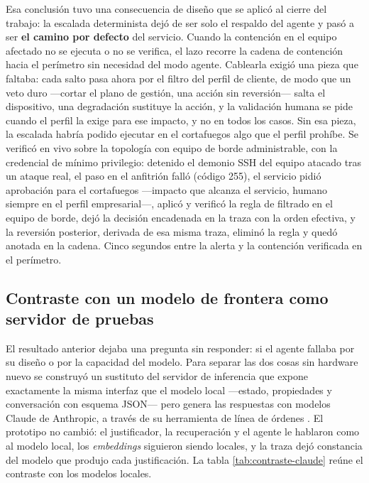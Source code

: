 Esa conclusión tuvo una consecuencia de diseño que se aplicó al cierre del trabajo: la escalada
determinista dejó de ser solo el respaldo del agente y pasó a ser \textbf{el camino por defecto} del
servicio. Cuando la contención en el equipo afectado no se ejecuta o no se verifica, el lazo recorre
la cadena de contención hacia el perímetro sin necesidad del modo agente. Cablearla exigió una
pieza que faltaba: cada salto pasa ahora por el filtro del perfil de cliente, de modo que un veto
duro ---cortar el plano de gestión, una acción sin reversión--- salta el dispositivo, una degradación
sustituye la acción, y la validación humana se pide cuando el perfil la exige para ese impacto, y no
en todos los casos. Sin esa pieza, la escalada habría podido ejecutar en el cortafuegos algo que el
perfil prohíbe. Se verificó en vivo sobre la topología con equipo de borde administrable, con la
credencial de mínimo privilegio: detenido el demonio SSH del equipo atacado tras un ataque real,
el paso en el anfitrión falló (código 255), el servicio pidió aprobación para el cortafuegos
---impacto que alcanza el servicio, humano siempre en el perfil empresarial---, aplicó y verificó
la regla de filtrado en el equipo de borde, dejó la decisión encadenada en la traza con la orden
efectiva, y la reversión posterior, derivada de esa misma traza, eliminó la regla y quedó anotada
en la cadena. Cinco segundos entre la alerta y la contención verificada en el perímetro.

\subsection{Contraste con un modelo de frontera como servidor de pruebas}
\label{sec:contraste-claude}

El resultado anterior dejaba una pregunta sin responder: si el agente fallaba por su diseño o por la
capacidad del modelo. Para separar las dos cosas sin hardware nuevo se construyó un sustituto del
servidor de inferencia que expone exactamente la misma interfaz que el modelo local ---estado,
propiedades y conversación con esquema JSON--- pero genera las respuestas con modelos Claude de
Anthropic, a través de su herramienta de línea de órdenes \cite{claudecode}. El prototipo no cambió:
el justificador, la recuperación y el agente le hablaron como al modelo local, los \emph{embeddings}
siguieron siendo locales, y la traza dejó constancia del modelo que produjo cada justificación. La
tabla \ref{tab:contraste-claude} reúne el contraste con los modelos locales.

